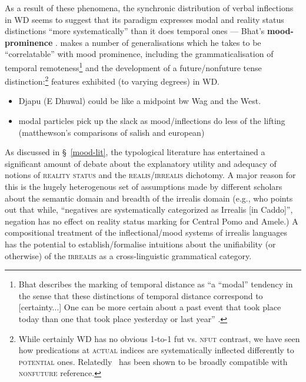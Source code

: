 As a result of these phenomena, the synchronic distribution of verbal inflections in WD seems to suggest that its paradigm expresses modal and reality status distinctions ``more systematically'' than it does temporal ones --- Bhat's \textbf{mood-prominence} \citeyearpar[136]{Bhat1999}. \citet[183]{Bhat1999} makes a number of generalisations which he takes to be ``correlatable'' with mood prominence, including the grammaticalisation of temporal remoteness\footnote{Bhat describes the marking of temporal distance  as ``a ``modal'' tendency in the sense that these distinctions of temporal distance correspond to [certainty...] One can be more certain about a past event that took place today than one that took place yesterday or last year'' \citeyearpar[183]{Bhat1999}.} and the development of a future/nonfuture tense distinction:\footnote{While certainly WD has no obvious 1-to-1 \gls{fut} vs. \textsc{nfut} contrast, we have seen how predications at \textsc{actual} indices are systematically inflected differently to \textsc{potential} ones. Relatedly \I~has been shown to be broadly compatible with \textsc{nonfuture} reference.} features exhibited (to varying degrees) in WD.


\begin{itemize}

\item Djapu (E Dhuwal) could be like a midpoint bw Wag and the West.

\item modal particles pick up the slack as mood/inflections do less of the lifting (matthewson's comparisons of salish and european)



\end{itemize}

As discussed in \S~\ref{mood-lit}, the typological literature has entertained a significant amount of debate about the explanatory utility and adequacy of notions of \textsc{reality status} and the \textsc{realis/irrealis} dichotomy. A major reason for this is the hugely heterogenous set of assumptions made by different scholars about the semantic domain and breadth of the irrealis domain (e.g., \citet[380]{Mithun1995} who points out that while, ``negatives are systematically categorized as Irrealis [in Caddo]'', negation has no effect on reality status marking for Central Pomo and Amele.) A compositional treatment of the inflectional/mood systems of irrealis languages has the potential to establish/formalise intuitions about the unifiability (or otherwise) of the \textsc{irrealis} as a cross-linguistic grammatical category.

